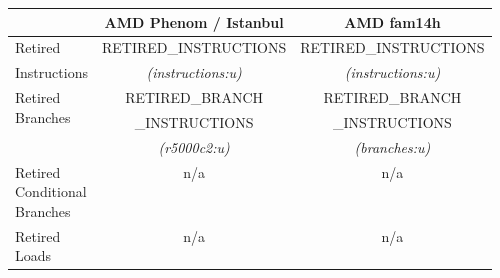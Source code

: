 \begin{tabular}{|l||c|c|}

\hline
    & 
AMD Phenom / Istanbul&
AMD fam14h \\
\hline
\hline


Retired                   &
RETIRED\_INSTRUCTIONS     & %
RETIRED\_INSTRUCTIONS    \\ %

Instructions                &
{\em (instructions:u)}      & %
{\em (instructions:u)}      \\ %

\hline
\multirow{3}{*}{\parbox{0.5in}{Retired \\
Branches}}                &
RETIRED\_BRANCH           & %
RETIRED\_BRANCH           \\ %
                  &  
\_INSTRUCTIONS       & %
\_INSTRUCTIONS      \\ %

                           &
{\em (r5000c2:u)}          & %
{\em (branches:u)}        \\ %

\hline
\multirow{3}{*}{\parbox{0.5in}{Retired \\
Conditional \\
Branches}}                &
\multirow{3}{*}{n/a}      & %
\multirow{3}{*}{n/a}     \\ %

                  &  
& %
\\ %

                      &
         & %
         \\ %


\hline
\multirow{3}{*}{\parbox{0.5in}{Retired \\Loads}}   &  
\multirow{3}{*}{n/a}      & %
\multirow{3}{*}{n/a}      \\ %

                         &
                         & %
                        \\ %

                         &
                         & %
                        \\ %


\end{tabular}
